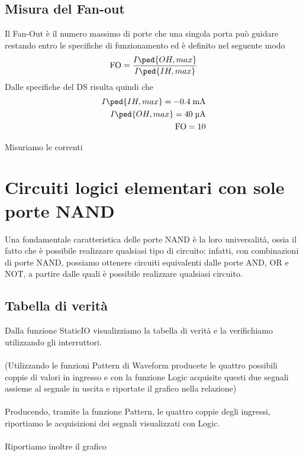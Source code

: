 \documentclass[10pt, a4paper, italian]{article}
\begin{document}
\subsection{Misura del Fan-out}
Il Fan-Out è il numero massimo di porte che una singola porta può guidare
restando entro le specifiche di funzionamento ed è definito nel seguente modo
\[
\text{FO} = \frac{I\ped{OH, max}}{I\ped{IH, max}}
\]
Dalle specifiche del DS risulta quindi che 
\begin{align*}
    I\ped{IH, max}= -0.4 \; \si{m\A} \\
    I\ped{OH, max}= 40 \; \si{\micro\A} \\
    \text{FO} = 10
\end{align*}

Misuriamo le correnti\\ 
\section{Circuiti logici elementari con sole porte NAND}
Una fondamentale caratteristica delle porte NAND è la loro universalità, ossia il fatto che è possibile realizzare qualsiasi tipo di circuito: infatti, con combinazioni di porte NAND, possiamo ottenere circuiti equivalenti dalle porte AND, OR e NOT, a partire dalle quali è possibile realizzare qualsiasi circuito.

\begin{figure}
    \label{fig: NAND}
\end{figure}

\subsection{Tabella di verità}
Dalla funzione StaticIO visualizziamo la tabella di verità e la verifichiamo utilizzando gli interruttori.\\
\\
(Utilizzando le funzioni Pattern di Waveform producete le quattro possibili coppie di valori in ingresso e con la funzione Logic acquisite questi due segnali assieme al segnale in uscita e riportate il grafico nella relazione)\\
\\
Producendo, tramite la funzione Pattern, le quattro coppie degli ingressi, riportiamo le acquisizioni dei segnali visualizzati con Logic.\\
\\
Riportiamo inoltre il grafico
\end{document}
